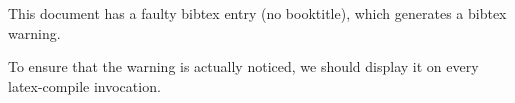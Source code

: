 \documentclass{article}
\begin{document}
This document has a faulty bibtex entry (no booktitle), which generates a bibtex warning.

To ensure that the warning is actually noticed, we should display it on every latex-compile invocation.

\cite{moi2014}



\end{document}
